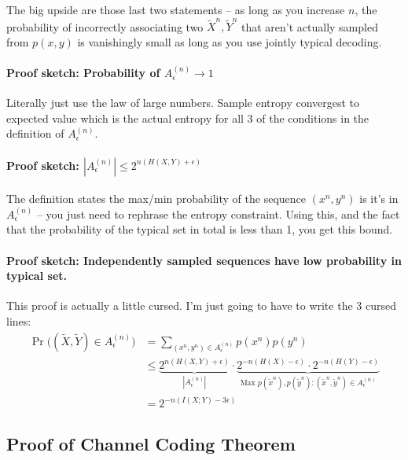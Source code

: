 \documentclass[a4paper,12pt]{report}
\begin{document}
The big upside are those last two statements -- as long as you increase $n$, the
probability of incorrectly associating two $\tilde X^n, \tilde Y^n$ that aren't
actually sampled from $p(x,y)$ is vanishingly small as long as you use jointly
typical decoding. 

\paragraph{Proof sketch: Probability of $A_\epsilon^{(n)} \to 1$ } Literally
just use the law of large numbers. Sample entropy convergest to expected value
which is the actual entropy for all 3 of the conditions in the definition of
$A_\epsilon^{(n)}$.

\paragraph{Proof sketch: $|A_\epsilon^{(n)}| \leq 2^{n(H(X, Y) + \epsilon)}$ }
The definition states the max/min probability of the sequence $(x^n, y^n)$ is
it's in $A_\epsilon^{(n)}$ -- you just need to rephrase the entropy constraint.
Using this, and the fact that the probability of the typical set in total is
less than 1, you get this bound.

\paragraph{Proof sketch: Independently sampled sequences have low probability in
typical set. } This proof is actually a little cursed. I'm just going to have to
write the 3 cursed lines:
\begin{align}
	\Pr \big( (\tilde X, \tilde Y) \in A_\epsilon^{(n)} \big) &= \sum_{(x^n,
	y^n) \in A_\epsilon^{(n)}} p(x^n)p(y^n) \\ 
	&\leq \underbrace{ 2^{n(H(X, Y) + \epsilon)} }_{|A_\epsilon^{(n)}|} 
		\cdot \underbrace {
			2^{-n( H(X) - \epsilon )} \cdot 2^{-n( H(Y) - \epsilon )}
		}_{\text{Max } p(\tilde x^n), p(\tilde y^n): (\tilde x^n, \tilde y^n) \in A_\epsilon^{(n)} }
		\\ 
	&= 2^{-n (I(X; Y) - 3\epsilon)}
\end{align}






\subsection{Proof of Channel Coding Theorem}
\end{document}
